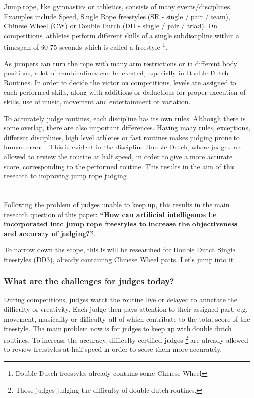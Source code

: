Jump rope, like gymnastics or athletics, consists of many events/disciplines. Examples include Speed, Single Rope freestyles (SR - single / pair / team), Chinese Wheel (CW) or Double Dutch (DD - single / pair / triad). On competitions, athletes perform different skills of a single subdiscipline within a timespan of 60-75 seconds which is called a freestyle \footnote{Double Dutch freestyles already contains some Chinese Wheel}.

As jumpers can turn the rope with many arm restrictions or in different body positions, a lot of combinations can be created, especially in Double Dutch Routines. In order to decide the victor on competitions, levels are assigned to each performed skills, along with additions or deductions for proper execution of skills, use of music, movement and entertainment or variation.

To accurately judge routines, each discipline has its own rules. Although there is some overlap, there are also important differences.
Having many rules, exceptions, different disciplines, high level athletes or fast routines makes judging prone to human error, \autocite{Heiniger2018}. This is evident in the discipline Double Dutch, where judges are allowed to review the routine at half speed, in order to give a more accurate score, corresponding to the performed routine. This results in the aim of this research to improving jump rope judging.

\section{}%
\label{sec:onderzoeksvraag}

Following the problem of judges unable to keep up, this results in the main research question of this paper: \textbf{``How can artificial intelligence be incorporated into jump rope freestyles to increase the objectiveness and accuracy of judging?''}.

To narrow down the scope, this is will be researched for Double Dutch Single freestyles (DD3), already containing Chinese Wheel parts. Let's jump into it.

\subsubsection{What are the challenges for judges today?}
\label{subsubsec:intro-bp-question-challenges-for-judges}

During competitions, judges watch the routine live or delayed to annotate the difficulty or creativity. Each judge then pays attention to their assigned part, e.g. movement, musicality or difficulty, all of which contribute to the total score of the freestyle. The main problem now is for judges to keep up with double dutch routines. To increase the accuracy, difficulty-certified judges \footnote{Those judges judging the difficulty of double dutch routines.} are already allowed to review freestyles at half speed in order to score them more accurately.

